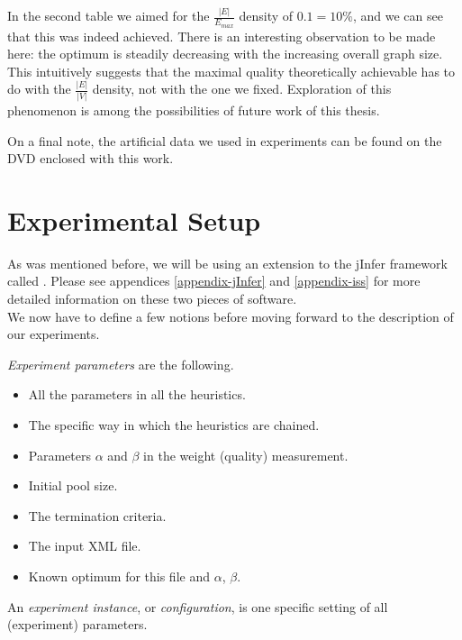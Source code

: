 In the second table we aimed for the $\frac{|E|}{E_{max}}$ density of $0.1 = 10\%$, and we can see that this was indeed achieved. There is an interesting observation to be made here: the optimum is steadily decreasing with the increasing overall graph size. This intuitively suggests that the maximal quality theoretically achievable has to do with the $\frac{|E|}{|V|}$ density, not with the one we fixed. Exploration of this phenomenon is among the possibilities of future work of this thesis.

On a final note, the artificial data we used in experiments can be found on the DVD enclosed with this work.

\section{Experimental Setup}

As was mentioned before, we will be using an extension to the jInfer framework called . Please see appendices \ref{appendix-jInfer} and \ref{appendix-iss} for more detailed information on these two pieces of software.\\

We now have to define a few notions before moving forward to the description of our experiments.

\begin{define}
	\label{define-experiment-params}
	\textit{Experiment parameters} are the following.
	\begin{itemize}
		\item All the parameters in all the heuristics.
		\item The specific way in which the heuristics are chained.
		\item Parameters $\alpha$ and $\beta$ in the weight (quality) measurement.
		\item Initial pool size.
		\item The termination criteria.
		\item The input XML file.
		\item Known optimum for this file and $\alpha$, $\beta$.
	\end{itemize}
\end{define}

\begin{define}
	\label{define-experiment-config}
	An \textit{experiment instance}, or \textit{configuration}, is one specific setting of all (experiment) parameters.
\end{define}

